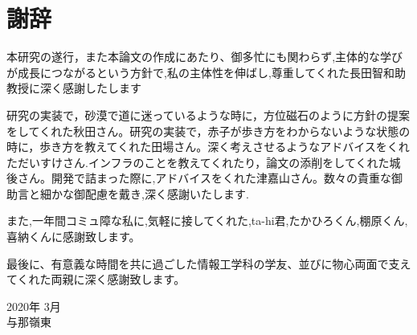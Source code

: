 \chapter*{謝辞}
\thispagestyle{empty}


\hspace{1zw}本研究の遂行，また本論文の作成にあたり、御多忙にも関わらず,主体的な学びが成長につながるという方針で,私の主体性を伸ばし,尊重してくれた長田智和助教授に深く感謝したします

研究の実装で，砂漠で道に迷っているような時に，方位磁石のように方針の提案をしてくれた秋田さん。研究の実装で，赤子が歩き方をわからないような状態の時に，歩き方を教えてくれた田場さん。深く考えさせるようなアドバイスをくれただいすけさん.インフラのことを教えてくれたり，論文の添削をしてくれた城後さん。開発で詰まった際に,アドバイスをくれた津嘉山さん。数々の貴重な御助言と細かな御配慮を戴き,深く感謝いたします.


また,一年間コミュ障な私に,気軽に接してくれた,ta-hi君,たかひろくん,棚原くん,喜納くんに感謝致します。

最後に、有意義な時間を共に過ごした情報工学科の学友、並びに物心両面で支えてくれた両親に深く感謝致します。

\begin{flushright}
 2020年 3月 \\ 与那嶺東
\end{flushright}


